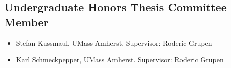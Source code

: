 \documentclass[Times]{article}
\begin{document}
\subsection*{Undergraduate Honors Thesis Committee Member}
\begin{itemize}
  \item Stefan Kussmaul, UMass Amherst. Supervisor: Roderic Grupen
  \item Karl Schmeckpepper, UMass Amherst. Supervisor: Roderic Grupen
\end{itemize}


\nocite{*}
\printbibheading
\bibbycategory
\end{document}

